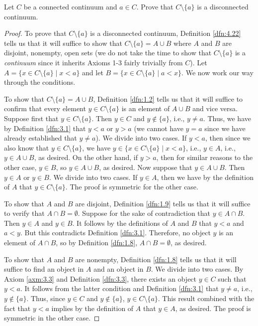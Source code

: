 \documentclass[../main.tex]{subfiles}
\begin{document}
\begin{exercise}\label{exr:4.23}
    Let $C$ be a connected continuum and $a\in C$. Prove that $C\setminus\{a\}$ is a disconnected continuum.
    \begin{proof}
        To prove that $C\setminus\{a\}$ is a disconnected continuum, Definition \ref{dfn:4.22} tells us that it will suffice to show that $C\setminus\{a\}=A\cup B$ where $A$ and $B$ are disjoint, nonempty, open sets (we do not take the time to show that $C\setminus\{a\}$ is a \emph{continuum} since it inherits Axioms 1-3 fairly trivially from $C$). Let $A=\{x\in C\setminus\{a\}\mid x<a\}$ and let $B=\{x\in C\setminus\{a\}\mid a<x\}$. We now work our way through the conditions.\par
        To show that $C\setminus\{a\}=A\cup B$, Definition \ref{dfn:1.2} tells us that it will suffice to confirm that every element $y\in C\setminus\{a\}$ is an element of $A\cup B$ and vice versa. Suppose first that $y\in C\setminus\{a\}$. Then $y\in C$ and $y\notin\{a\}$, i.e., $y\neq a$. Thus, we have by Definition \ref{dfn:3.1} that $y<a$ or $y>a$ (we cannot have $y=a$ since we have already established that $y\neq a$). We divide into two cases. If $y<a$, then since we also know that $y\in C\setminus\{a\}$, we have $y\in\{x\in C\setminus\{a\}\mid x<a\}$, i.e., $y\in A$, i.e., $y\in A\cup B$, as desired. On the other hand, if $y>a$, then for similar reasons to the other case, $y\in B$, so $y\in A\cup B$, as desired. Now suppose that $y\in A\cup B$. Then $y\in A$ or $y\in B$. We divide into two cases. If $y\in A$, then we have by the definition of $A$ that $y\in C\setminus\{a\}$. The proof is symmetric for the other case.\par
        To show that $A$ and $B$ are disjoint, Definition \ref{dfn:1.9} tells us that it will suffice to verify that $A\cap B=\emptyset$. Suppose for the sake of contradiction that $y\in A\cap B$. Then $y\in A$ and $y\in B$. It follows by the definitions of $A$ and $B$ that $y<a$ and $a<y$. But this contradicts Definition \ref{dfn:3.1}. Therefore, no object $y$ is an element of $A\cap B$, so by Definition \ref{dfn:1.8}, $A\cap B=\emptyset$, as desired.\par
        To show that $A$ and $B$ are nonempty, Definition \ref{dfn:1.8} tells us that it will suffice to find an object in $A$ and an object in $B$. We divide into two cases. By Axiom \ref{axm:3.3} and Definition \ref{dfn:3.3}, there exists an object $y\in C$ such that $y<a$. It follows from the latter condition and Definition \ref{dfn:3.1} that $y\neq a$, i.e., $y\notin\{a\}$. Thus, since $y\in C$ and $y\notin\{a\}$, $y\in C\setminus\{a\}$. This result combined with the fact that $y<a$ implies by the definition of $A$ that $y\in A$, as desired. The proof is symmetric in the other case.\par

\end{proof}
\end{exercise}
\end{document}
